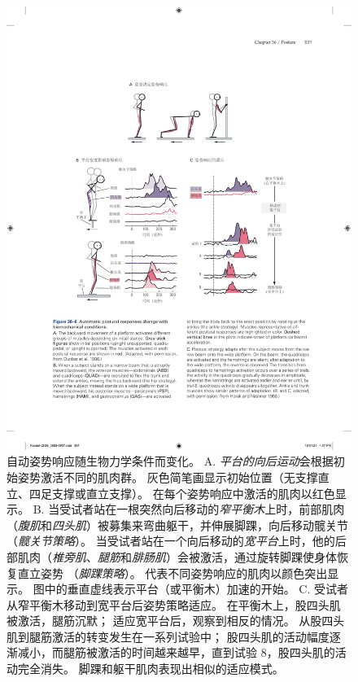 \begin{figure}[htbp]
	\centering
	\includegraphics[width=1.0\linewidth]{chap36/fig_36_6}
	\caption{自动姿势响应随生物力学条件而变化。
		A. \textit{平台的向后运动}会根据初始姿势激活不同的肌肉群。
		灰色简笔画显示初始位置（无支撑直立、四足支撑或直立支撑）。
		在每个姿势响应中激活的肌肉以红色显示\cite{dunbar1986neural}。
		B. 当受试者站在一根突然向后移动的\textit{窄平衡木}上时，前部肌肉（\textit{腹肌}和\textit{四头肌}）被募集来弯曲躯干，并伸展脚踝，向后移动髋关节（\textit{髋关节策略}）。
		当受试者站在一个向后移动的\textit{宽平台}上时，他的后部肌肉（\textit{椎旁肌}、\textit{腿筋}和\textit{腓肠肌}）会被激活，通过旋转脚踝使身体恢复直立姿势 （\textit{脚踝策略}）。
		代表不同姿势响应的肌肉以颜色突出显示。
		图中的垂直虚线表示平台（或平衡木）加速的开始。
		C. 受试者从窄平衡木移动到宽平台后姿势策略适应。
		在平衡木上，股四头肌被激活，腿筋沉默；
		适应宽平台后，观察到相反的情况。
		从股四头肌到腿筋激活的转变发生在一系列试验中；
		股四头肌的活动幅度逐渐减小，而腿筋被激活的时间越来越早，直到试验 8，股四头肌的活动完全消失。
		脚踝和躯干肌肉表现出相似的适应模式\cite{horak1986central}。}
	\label{fig:36_6}
\end{figure}


